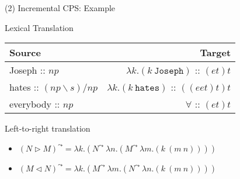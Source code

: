 \documentclass{beamer}
\newcommand{\term}[1]{\texttt{#1}}
\newcommand{\barkr}[1]{#1^{\leadsto}}
\begin{document}
\begin{frame}{(2) Incremental CPS: Example}
	\small
	\begin{center}
		\alert{Lexical Translation}\\
		
	\begin{tabularx}{0.7\textwidth}{lr}
	Source & Target\\
	\toprule
	 Joseph :: $np$ & $\lambda k.(k \ \term{Joseph})$ :: $(et)t$\\
	 hates :: $(np\backslash s)/np$ &$\lambda k.(k \ \term{hates})$ :: $((eet)t)t$ \\
	 everybody :: $np$ & $\forall$ :: $(et)t$
	\end{tabularx}
	\end{center}\vfill
	
	\pause
	\alert{Left-to-right translation}
	\begin{itemize}
		\item[] $\barkr{(N \triangleright M)} = 
			\lambda k.(\barkr{N} \ \lambda n.(\barkr{M} \ \lambda m.(k \ (m \ n))))$
		\item[] $\barkr{(M \triangleleft N)} =
			\lambda k.(\barkr{M} \ \lambda m.(\barkr{N} \ \lambda n.(k \ (m \ n))))$			
	\end{itemize}
	\vspace{-10pt}
	

\end{frame}
\end{document}
